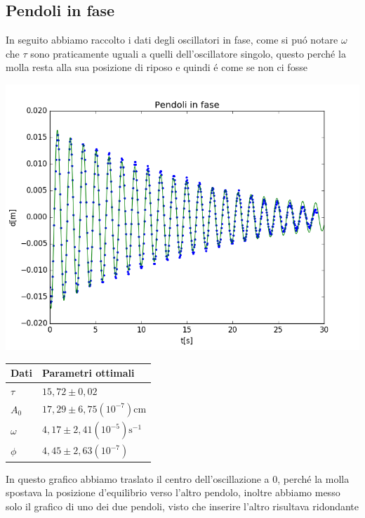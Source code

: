 \documentclass{exam}
\begin{document}
			\subsection{Pendoli in fase}
			In seguito abbiamo raccolto i dati degli oscillatori in fase, come si pu\'o notare $\omega$ che $\tau$ sono praticamente uguali a quelli dell'oscillatore singolo, questo perch\'e la molla resta alla sua posizione di riposo e quindi \'e come se non ci fosse\\
			\begin{minipage}{0.5\textwidth}
				\includegraphics[width=\textwidth]{fase}
			\end{minipage}
			\begin{minipage}{0.5\textwidth}
				\begin{tabular}{ll}
					\toprule
					Dati & Parametri ottimali \\
					\midrule
					$\tau$ & $15,72 \pm 0,02$ \\
					$A_{0}$ & $17,29 \pm 6,75(10^{-7})$cm\\
					$\omega$ & $4,17 \pm 2,41(10^{-5})\textrm{s}^{-1}$\\			
					$\phi$ & $4,45 \pm 2,63(10^{-7})$\\
					\bottomrule
				\end{tabular}
			\end{minipage}
			In questo grafico abbiamo traslato il centro dell'oscillazione a 0, perch\'e la molla spostava la posizione d'equilibrio verso l'altro pendolo, inoltre abbiamo messo solo il grafico di uno dei due pendoli, visto che inserire l'altro risultava ridondante
\end{document}
